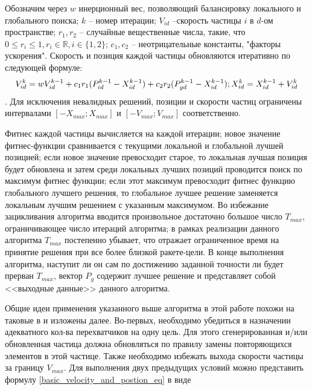 Обозначим через $w$ инерционный вес, позволяющий балансировку локального и глобального поиска; $k$ -- номер итерации; $V_{id}$ --скорость частицы $i$ в  $d$-ом пространстве; $r_1, r_2$ -- случайные вещественные числа, такие, что $0 \le r_i \le 1, r_i \in \mathbb{R}, i \in \{1,2\}$; $c_1, c_2$ -- неотрицательные константы, "факторы ускорения".   Скорость и позиция каждой частицы обновляются итеративно по следующей формуле: 
\begin{equation} \label{basic_velocity_and_postion_eq}
	V_{id}^{k} = wV_{id}^{k-1}+c_1r_1(P_{id}^{k-1}-X_{id}^{k-1}) + c_2 r_2(P_{gd}^{k-1} - X_{id}^{k-1}); \\
	X_{id}^{k} = X_{id}^{k-1} + V_{id}^{k}
\end{equation}
 . Для исключения невалидных решений, позиции и скорости частиц ограничены интервалами $[-X_{max}; X_{max}]$ и $[-V_{max}; V_{max}]$ соответственно.

Фитнес каждой частицы вычисляется на каждой итерации; новое значение фитнес-функции сравнивается с текущими локальной и глобальной лучшей позицией; если новое значение превосходит старое, то локальная лучшая позиция будет обновлена и затем среди локальных лучших позиций проводится поиск по максимум фитнес функции; если этот максимум превосходит фитнес функцию глобального лучшего решения, то глобальное лучшее решение заменяется локальным лучшим решением с указанным максимумом. Во избежание зацикливания алгоритма вводится произвольное достаточно большое число $T_{max}$, ограничивающее число итераций алгоритма; в рамках реализации данного алгоритма $T_{max}$ постепенно убывает, что отражает ограниченное время на принятие решения при все более близкой ракете-цели. В конце выполнения алгоритма, наступит ли он сам по достижению заданной точности ли будет прерван $T_{max}$, вектор $P_g$ содержит лучшее решение и представляет собой <<выходные данные>> данного алгоритма.


Общие идеи применения указанного выше алгоритма в этой работе похожи на таковые в %
и изложены далее. Во-первых, необходимо убедиться в  назначении адекватного кол-ва перехватчиков на одну цель. Для этого сгенерированная и/или обновленная частица должна обновляться по правилу замены повторяющихся элементов в этой частице. Также необходимо избежать выхода скорости частицы за границу $V_{max}$. Для выполнения двух предыдущих условий можно представить формулу \ref{basic_velocity_and_postion_eq} в виде 


